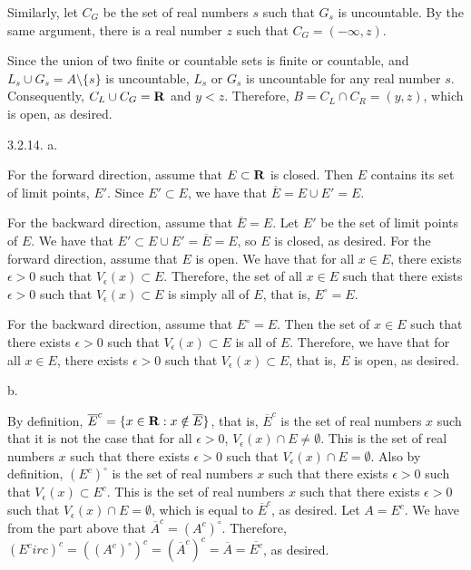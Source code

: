 Similarly, let $C_G$ be the set of real numbers $s$
such that $G_s$ is uncountable.
By the same argument, there is a real number $z$
such that $C_G = (-\infty, z)$.

Since the union of two finite or countable sets is finite or countable,
and $L_s \cup G_s = A \setminus \{s\}$ is uncountable,
$L_s$ or $G_s$ is uncountable for any real number $s$.
Consequently, $C_L \cup C_G = {\bf R}$ and $y < z$.
Therefore, $B = C_L \cap C_R = (y,z)$, which is open, as desired.
\bigskip\goodbreak
\item{3.2.14.} a.

For the forward direction, assume that $E \subset {\bf R}$ is closed.
Then $E$ contains its set of limit points, $E'$.
Since $E' \subset E$, we have that $\overline E = E \cup E' = E$.

For the backward direction, assume that $\overline E = E$.
Let $E'$ be the set of limit points of $E$.
We have that $E' \subset E \cup E' = \overline E = E$,
so $E$ is closed, as desired.
\smallskip
For the forward direction, assume that $E$ is open.
We have that for all $x \in E$,
there exists $\epsilon > 0$ such that $V_\epsilon(x) \subset E$.
Therefore, the set of all $x \in E$ such that
there exists $\epsilon > 0$ such that $V_\epsilon(x) \subset E$
is simply all of $E$, that is, $E^\circ = E$.

For the backward direction, assume that $E^\circ = E$.
Then the set of $x \in E$ such that
there exists $\epsilon > 0$ such that $V_\epsilon(x) \subset E$
is all of $E$.
Therefore, we have that for all $x \in E$,
there exists $\epsilon > 0$ such that $V_\epsilon(x) \subset E$,
that is, $E$ is open, as desired.
\medskip
\item{} b.

By definition, $\overline E^c =
\{x \in {\bf R} : x \notin \overline E\}$, that is,
$\overline E^c$ is the set of real numbers $x$ such that
it is not the case that for all $\epsilon > 0$,
$V_\epsilon(x) \cap E \ne \emptyset$.
This is the set of real numbers $x$ such that there exists $\epsilon > 0$
such that $V_\epsilon(x) \cap E = \emptyset$.
Also by definition, $(E^c)^\circ$ is the set of real numbers $x$ such that
there exists $\epsilon > 0$ such that $V_\epsilon(x) \subset E^c$.
This is the set of real numbers $x$ such that there exists $\epsilon > 0$
such that $V_\epsilon(x) \cap E = \emptyset$,
which is equal to $\overline E^c$, as desired.
\smallskip
Let $A = E^c$.
We have from the part above that $\overline A^c = (A^c)^\circ$.
Therefore, $(E^circ)^c = ((A^c)^\circ)^c = (\overline A^c)^c =
\overline A = \overline{E^c}$, as desired.
\bye
